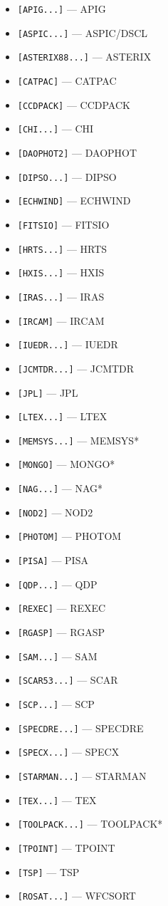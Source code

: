 \begin{itemize}
\item {\tt [APIG...]} --- APIG
\item {\tt [ASPIC...]} --- ASPIC/DSCL
\item {\tt [ASTERIX88...]} --- ASTERIX
\item {\tt [CATPAC]} --- CATPAC
\item {\tt [CCDPACK]} --- CCDPACK
\item {\tt [CHI...]} --- CHI
\item {\tt [DAOPHOT2]} --- DAOPHOT
\item {\tt [DIPSO...]} --- DIPSO
\item {\tt [ECHWIND]} --- ECHWIND
\item {\tt [FITSIO]} --- FITSIO
\item {\tt [HRTS...]} --- HRTS
\item {\tt [HXIS...]} --- HXIS
\item {\tt [IRAS...]} --- IRAS
\item {\tt [IRCAM]} --- IRCAM
\item {\tt [IUEDR...]} --- IUEDR
\item {\tt [JCMTDR...]} --- JCMTDR
\item {\tt [JPL]} --- JPL
\item {\tt [LTEX...]} --- LTEX
\item {\tt [MEMSYS...]} --- MEMSYS*
\item {\tt [MONGO]} --- MONGO*
\item {\tt [NAG...]} --- NAG*
\item {\tt [NOD2]} --- NOD2
\item {\tt [PHOTOM]} --- PHOTOM
\item {\tt [PISA]} --- PISA
\item {\tt [QDP...]} --- QDP
\item {\tt [REXEC]} --- REXEC
\item {\tt [RGASP]} --- RGASP
\item {\tt [SAM...]} --- SAM
\item {\tt [SCAR53...]} --- SCAR
\item {\tt [SCP...]} --- SCP
\item {\tt [SPECDRE...]} --- SPECDRE
\item {\tt [SPECX...]} --- SPECX
\item {\tt [STARMAN...]} --- STARMAN
\item {\tt [TEX...]} --- TEX
\item {\tt [TOOLPACK...]} --- TOOLPACK*
\item {\tt [TPOINT]} --- TPOINT
\item {\tt [TSP]} --- TSP
\item {\tt [ROSAT...]} --- WFCSORT
\end{itemize}


